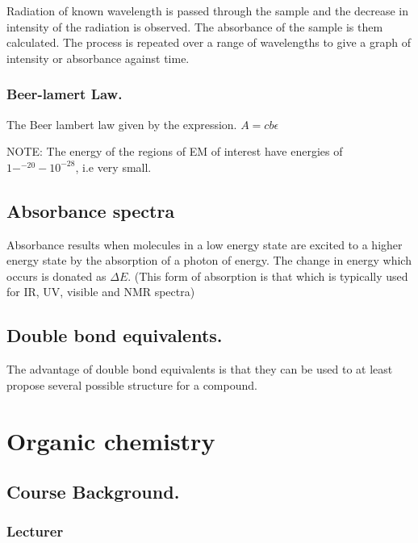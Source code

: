 \documentclass[]{article}
\begin{document}
Radiation of known wavelength is passed through the sample and the
decrease in intensity of the radiation is observed. The absorbance of
the sample is them calculated. The process is repeated over a range of
wavelengths to give a graph of intensity or absorbance against time.

\subsubsection{Beer-lamert Law.}\label{beer-lamert-law.}

The Beer lambert law given by the expression. \(A=cb\epsilon\)

NOTE: The energy of the regions of EM of interest have energies of
\(1-^{-20}-10^{-28}\), i.e very small.

\subsection{Absorbance spectra}\label{absorbance-spectra}

Absorbance results when molecules in a low energy state are excited to a
higher energy state by the absorption of a photon of energy. The change
in energy which occurs is donated as \(\Delta E\). (This form of
absorption is that which is typically used for IR, UV, visible and NMR
spectra)

\subsection{Double bond equivalents.}\label{double-bond-equivalents.}

The advantage of double bond equivalents is that they can be used to at
least propose several possible structure for a compound.

\section{Organic chemistry}\label{organic-chemistry}

\subsection{Course Background.}\label{course-background.}

\subsubsection{Lecturer}\label{lecturer}
\end{document}
